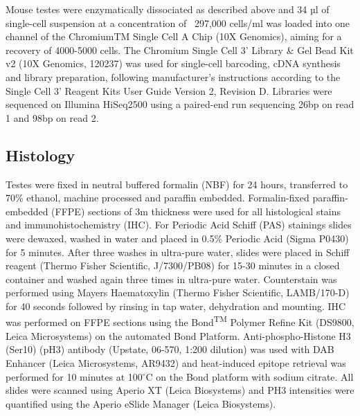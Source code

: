 Mouse testes were enzymatically dissociated as described above and 34 µl of single-cell suspension at a concentration of ~297,000 cells/ml was loaded into one channel of the ChromiumTM Single Cell A Chip (10X Genomics\textsuperscript{\textregistered}), aiming for a recovery of 4000-5000 cells. The Chromium Single Cell 3’ Library \& Gel Bead Kit v2 (10X Genomics\textsuperscript{\textregistered}, 120237) was used for single-cell barcoding, cDNA synthesis and library preparation, following manufacturer’s instructions according to the Single Cell 3’ Reagent Kits User Guide Version 2, Revision D. Libraries were sequenced on Illumina HiSeq2500 using a paired-end run sequencing 26bp on read 1 and 98bp on read 2. 

\subsection{Histology}
Testes were fixed in neutral buffered formalin (NBF) for 24 hours, transferred to 70\% ethanol, machine processed and paraffin embedded. Formalin-fixed paraffin-embedded (FFPE) sections of 3\textmu{}m thickness were used for all histological stains and immunohistochemistry (IHC). For Periodic Acid Schiff (PAS) stainings slides were dewaxed, washed in water and placed in 0.5\% Periodic Acid (Sigma P0430) for 5 minutes. After three washes in ultra-pure water, slides were placed in Schiff reagent (Thermo Fisher Scientific, J/7300/PB08) for 15-30 minutes in a closed container and washed again three times in ultra-pure water. Counterstain was performed using Mayers Haematoxylin (Thermo Fisher Scientific, LAMB/170-D) for 40 seconds followed by rinsing in tap water, dehydration and mounting. IHC was performed on FFPE sections using the Bond\textsuperscript{TM} Polymer Refine Kit (DS9800, Leica Microsystems) on the automated Bond Platform. Anti-phospho-Histone H3 (Ser10) (pH3) antibody (Upstate, 06-570, 1:200 dilution) was used with DAB Enhancer (Leica Microsystems, AR9432) and heat-induced epitope retrieval was performed for 10 minutes at 100$^\circ$C on the Bond platform with sodium citrate. All slides were scanned using Aperio XT (Leica Biosystems) and PH3 intensities were quantified using the Aperio eSlide Manager (Leica Biosystems). 


